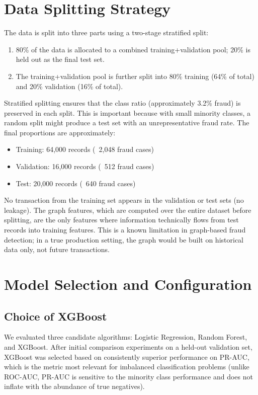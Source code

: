 \section{Data Splitting Strategy}

\label{sec:split}

The data is split into three parts using a two-stage stratified split:

\begin{enumerate}
    \item 80\% of the data is allocated to a combined training+validation pool; 20\% is held out as the final test set.
    \item The training+validation pool is further split into 80\% training (64\% of total) and 20\% validation (16\% of total).
\end{enumerate}

Stratified splitting ensures that the class ratio (approximately 3.2\% fraud) is preserved in each split. This is important because with small minority classes, a random split might produce a test set with an unrepresentative fraud rate. The final proportions are approximately:

\begin{itemize}
    \item Training: 64,000 records (~2,048 fraud cases)
    \item Validation: 16,000 records (~512 fraud cases)
    \item Test: 20,000 records (~640 fraud cases)
\end{itemize}

No transaction from the training set appears in the validation or test sets (no leakage). The graph features, which are computed over the entire dataset before splitting, are the only features where information technically flows from test records into training features. This is a known limitation in graph-based fraud detection; in a true production setting, the graph would be built on historical data only, not future transactions.

\section{Model Selection and Configuration}

\subsection{Choice of XGBoost}

We evaluated three candidate algorithms: Logistic Regression, Random Forest, and XGBoost. After initial comparison experiments on a held-out validation set, XGBoost was selected based on consistently superior performance on PR-AUC, which is the metric most relevant for imbalanced classification problems (unlike ROC-AUC, PR-AUC is sensitive to the minority class performance and does not inflate with the abundance of true negatives).

